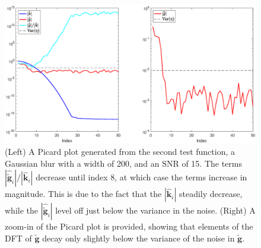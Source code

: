 \documentclass[12pt]{article}
\newcommand{\gnoise}{\widetilde{\mathbf{g}}}
\newcommand{\kdis}{\mathbf{k}}
\begin{document}
\begin{figure}
	\centerline{\includegraphics[scale = 0.45]{Figures/PicardPlot1D_F2_S15_W200.eps}}
\caption{(Left) A Picard plot generated from the second test function, a Gaussian blur with a width of 200, and an SNR of 15. The terms $|\widehat{\gnoise}_i|/|\widehat{\kdis}_i|$ decrease until index 8, at which case the terms increase in magnitude. This is due to the fact that the $|\widehat{\kdis}_i|$ steadily decrease, while the $|\widehat{\gnoise}_i|$ level off just below the variance in the noise. (Right) A zoom-in of the Picard plot is provided, showing that elements of the DFT of $\gnoise$ decay only slightly below the variance of the noise in $\gnoise$.}
\label{PicardPlot}
\end{figure}
\end{document}
